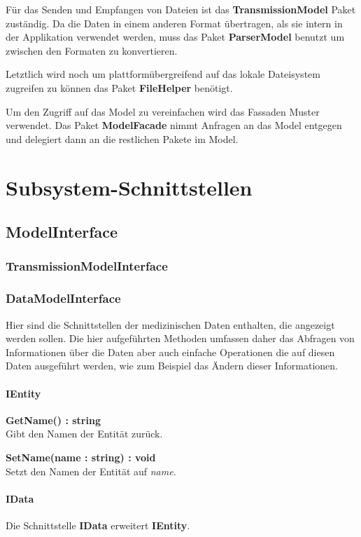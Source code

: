 \documentclass[a4paper]{scrreprt}
\begin{document}
Für das Senden und Empfangen von Dateien ist das \textbf{TransmissionModel} Paket zuständig.
Da die Daten in einem anderen Format übertragen, als sie intern in der Applikation verwendet werden, muss das Paket \textbf{ParserModel} benutzt um zwischen den Formaten zu konvertieren.

Letztlich wird noch um plattformübergreifend auf das lokale Dateisystem zugreifen zu können das Paket \textbf{FileHelper} benötigt.

Um den Zugriff auf das Model zu vereinfachen wird das Fassaden Muster verwendet. Das Paket \textbf{ModelFacade} nimmt Anfragen an das Model entgegen und delegiert dann an die restlichen Pakete im Model.

\section{Subsystem-Schnittstellen}
\subsection{ModelInterface}
\subsubsection{TransmissionModelInterface}
\subsubsection{DataModelInterface}
Hier sind die Schnittstellen der medizinischen Daten enthalten, die angezeigt werden sollen. Die hier aufgeführten Methoden umfassen daher das Abfragen von Informationen über die Daten aber auch einfache Operationen die auf diesen Daten ausgeführt werden, wie zum Beispiel das Ändern dieser Informationen.

\paragraph{IEntity}

\textbf{GetName() : string}\\
Gibt den Namen der Entität zurück.

\textbf{SetName(name : string) : void}\\
Setzt den Namen der Entität auf \textit{name}.

\paragraph{IData}
Die Schnittstelle \textbf{IData} erweitert \textbf{IEntity}.
\end{document}

